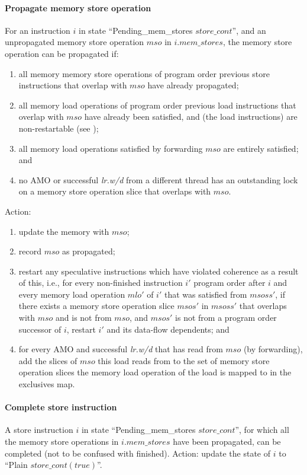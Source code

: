 \paragraph{Propagate memory store operation}\label{omm:thread:prop_mem_write}
For an instruction $i$ in state ``{\sc Pending\_mem\_stores} $store\_cont$'', and an unpropagated memory store operation $mso$ in $i.mem\_stores$, the memory store operation can be propagated if:
\begin{enumerate}
\item all memory memory store operations of program order previous store instructions that overlap with $mso$ have already propagated;
\item all memory load operations of program order previous load instructions that overlap with $mso$ have already been satisfied, and (the load instructions) are non-restartable (see );
\item all memory load operations satisfied by forwarding $mso$ are entirely satisfied; and
\item no AMO or successful {\em lr.w/d} from a different thread has an outstanding lock on a memory store operation slice that overlaps with $mso$.
\end{enumerate}
Action:
\begin{enumerate}
\item update the memory with $mso$;
\item record $mso$ as propagated;
\item restart any speculative instructions which have violated coherence as a result of this, i.e., for every non-finished instruction $i'$ program order after $i$ and every memory load operation $mlo'$ of $i'$ that was satisfied from $msoss'$, if there exists a memory store operation slice $msos'$ in $msoss'$ that overlaps with $mso$ and is not from $mso$, and $msos'$ is not from a program order successor of $i$, restart $i'$ and its data-flow dependents; and
\item for every AMO and successful {\em lr.w/d} that has read from $mso$ (by forwarding), add the slices of $mso$ this load reads from to the set of memory store operation slices the memory load operation of the load is mapped to in the exclusives map.
\end{enumerate}

\paragraph{Complete store instruction}\label{omm:thread:complete_store}
A store instruction $i$ in state ``{\sc Pending\_mem\_stores} $store\_cont$'', for which all the memory store operations in $i.mem\_stores$ have been propagated, can be completed (not to be confused with finished).
Action: update the state of $i$ to ``{\sc Plain} $store\_cont(true)$''.


